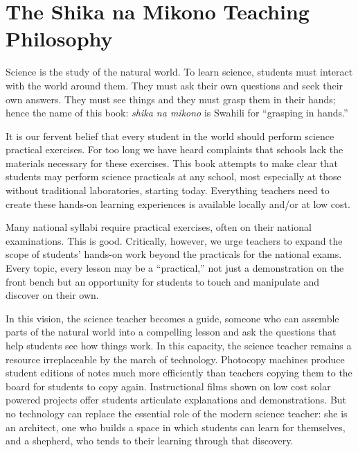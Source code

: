 \chapter{The Shika na Mikono Teaching Philosophy}

Science is the study of the natural world. 
To learn science, students must interact with the world around them. 
They must ask their own questions and seek their own answers. 
They must see things and they must grasp them in their hands; 
hence the name of this book: 
\textit{shika na mikono} is Swahili 
for “grasping in hands.”

It is our fervent belief that every student in the world 
should perform science practical exercises. 
For too long we have heard complaints that schools lack the materials 
necessary for these exercises. 
This book attempts to make clear that students may perform 
science practicals at any school, 
most especially at those without traditional laboratories, starting today. 
Everything teachers need to create these hands-on learning experiences 
is available locally and/or at low cost.

Many national syllabi require practical exercises, 
often on their national examinations. 
This is good. 
Critically, however, we urge teachers to expand the scope of 
students' hands-on work beyond the practicals for the national exams. 
Every topic, every lesson may be a “practical,” 
not just a demonstration on the front bench 
but an opportunity for students to touch 
and manipulate and discover on their own.

In this vision, the science teacher becomes a guide, 
someone who can assemble parts of the natural world 
into a compelling lesson and ask the questions that help students see how things work. 
In this capacity, the science teacher remains a resource 
irreplaceable by the march of technology. 
Photocopy machines produce student editions of notes 
much more efficiently than teachers copying them to the board 
for students to copy again. 
Instructional films shown on low cost solar powered projects 
offer students articulate explanations and demonstrations. 
But no technology can replace the essential role of 
the modern science teacher: she is an architect, 
one who builds a space in which students can learn for themselves, 
and a shepherd, who tends to their learning through that discovery.

